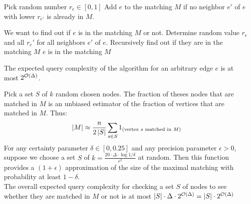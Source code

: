 \documentclass[11pt, oneside]{book}   						%
\begin{document}
\begin{algorithm}
\caption{}\label{rgmma}
\begin{algorithmic}[1]
\ForEach [edge $e$]
	\State Pick random number $r_e\in[0,1]$
\EndForEach
{}
	\State Add $e$ to the matching $M$ if no neighbor $e'$ of $e$ with lower $r_{e'}$ is already in $M$.
\EndFor
\end{algorithmic}
\end{algorithm}

\begin{algorithm}
\caption{}\label{cmma}
\begin{algorithmic}[1]
\State We want to find out if $e$ is in the matching $M$ or not.
\State Determine random value $r_e$ and all $r_e'$ for all neighbors $e'$ of $e$.
\ForEach [$e'$ with $r_e' < r_e$]
	\State Recursively find out if they are in the matching $M$
\EndForEach
{}
	\State $e$ is in the matching $M$
\EndIf
\end{algorithmic}
\end{algorithm}
\begin{mythm} The expected query complexity of the algorithm for an arbitrary edge $e$ is at most $2^{\mathcal{O}(\Delta)}$.\end{mythm}
\begin{mythm} Pick a set $S$ of $k$ random chosen nodes. The fraction of theses nodes that are matched in $M$ is an unbiased estimator of the fraction of vertices that are matched in $M$. Thus:
$$ \left\vert M \right\vert \approx \frac{n}{2\left\vert S \right\vert}\sum_{s\in S}1_{(\text{vertex } s \text{ matched in }M)}$$
For any certainty parameter $\delta\in [0,0.25]$ and any precision parameter $\epsilon > 0$, suppose we choose a set $S$ of $k=\frac{20\cdot\Delta\cdot\log1/\delta}{\epsilon^2}$ at random. Then this function provides a $(1+\epsilon)$ approximation of the size of the maximal matching with probability at least $1-\delta$.\\
The overall expected query complexity for checking a set $S$ of nodes to see whether they are matched in $M$ or not is at most $\left\vert S \right\vert\cdot \Delta \cdot 2^{\mathcal{O}(\Delta)} = \left\vert S \right\vert\cdot 2^{\mathcal{O}(\Delta)}$\end{mythm}

\end{document}
